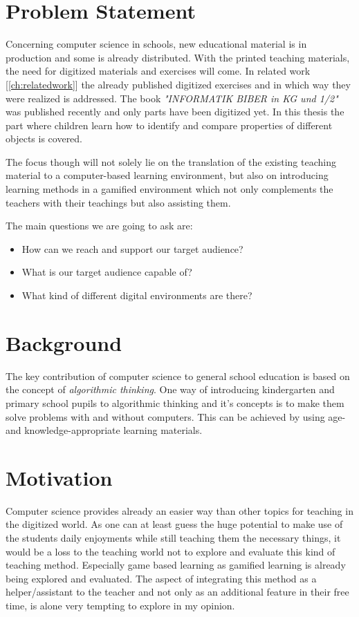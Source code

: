 \section{Problem Statement}\label{sec:problem-statement}
Concerning computer science in schools, new educational material is in production and some is already distributed.
With the printed teaching materials, the need for digitized materials and exercises will come.
In related work [\ref{ch:relatedwork}] the already published digitized exercises and
in which way they were realized is addressed.
The book \textit{"INFORMATIK BIBER in KG und 1/2"}\cite{ibkg12} was published recently and only parts have been digitized yet.
In this thesis the part where children learn how to identify and compare properties of different objects is covered.

The focus though will not solely lie on the translation of the existing teaching material to a
computer-based learning environment, but also on introducing learning methods in a gamified environment which
not only complements the teachers with their teachings but also assisting them.

The main questions we are going to ask are:

\begin{itemize}
    \item How can we reach and support our target audience?
    \item What is our target audience capable of?
    \item What kind of different digital environments are there?
\end{itemize}

\section{Background}\label{sec:background}
The key contribution of computer science to general school education is based on the concept of
\textit{algorithmic thinking}\cite{HKKS17}.
One way of introducing kindergarten and primary school pupils to algorithmic thinking and
it's concepts is to make them solve problems with and without computers.
This can be achieved by using age- and knowledge-appropriate learning materials.

\section{Motivation}\label{sec:motivation}
Computer science provides already an easier way than other topics for teaching in the digitized world.
As one can at least guess the huge potential to make use of the students daily enjoyments while still teaching
them the necessary things, it would be a loss to the teaching world not to explore and evaluate this kind of teaching
method. Especially game based learning as gamified learning is already being explored and evaluated.
The aspect of integrating this method as a helper/assistant to the teacher and not only as an additional feature in
their free time, is alone very tempting to explore in my opinion.

